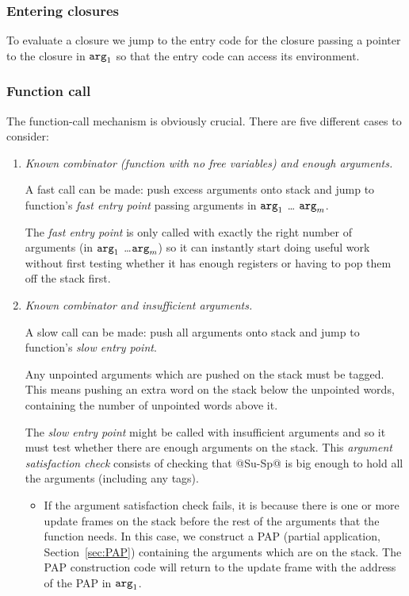 \documentclass[11pt]{article}
\newcommand{\Arg}[1]{\mbox{${\tt arg}_{#1}$}}
\newcommand{\secref}[1]{Section~\ref{sec:#1}}
\newcommand{\Subsubsection}[2]{\subsubsection{#1}\label{sec:#2}}
\begin{document}
\Subsubsection{Entering closures}{entering-closures}

To evaluate a closure we jump to the entry code for the closure
passing a pointer to the closure in \Arg{1} so that the entry code can
access its environment.

\Subsubsection{Function call}{ghc-fun-call}

The function-call mechanism is obviously crucial.  There are five different
cases to consider:
\begin{enumerate}

\item \emph{Known combinator (function with no free variables) and
enough arguments.}

A fast call can be made: push excess arguments onto stack and jump to
function's \emph{fast entry point} passing arguments in \Arg{1} \ldots
\Arg{m}.

The \emph{fast entry point} is only called with exactly the right
number of arguments (in \Arg{1} \ldots \Arg{m}) so it can instantly
start doing useful work without first testing whether it has enough
registers or having to pop them off the stack first.

\item \emph{Known combinator and insufficient arguments.}

A slow call can be made: push all arguments onto stack and jump to
function's \emph{slow entry point}.

Any unpointed arguments which are pushed on the stack must be tagged.
This means pushing an extra word on the stack below the unpointed
words, containing the number of unpointed words above it.


The \emph{slow entry point} might be called with insufficient arguments
and so it must test whether there are enough arguments on the stack.
This \emph{argument satisfaction check} consists of checking that
@Su-Sp@ is big enough to hold all the arguments (including any tags).

\begin{itemize} 

\item If the argument satisfaction check fails, it is because there is
one or more update frames on the stack before the rest of the
arguments that the function needs.  In this case, we construct a PAP
(partial application, \secref{PAP}) containing the arguments
which are on the stack.  The PAP construction code will return to the
update frame with the address of the PAP in \Arg{1}.


\end{itemize}
\end{enumerate}
\end{document}
